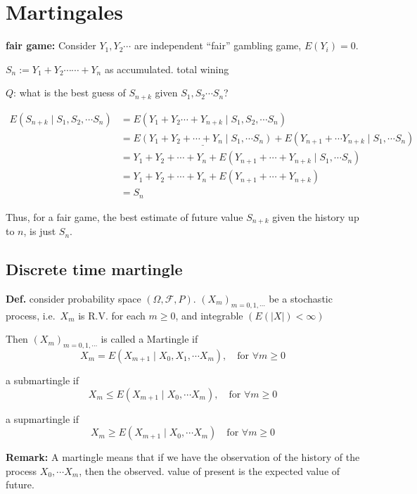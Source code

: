 \documentclass[
  letterpaper,
  DIV=11,
  numbers=noendperiod]{scrreprt}
\theoremstyle{definition}
\theoremstyle{plain}
\theoremstyle{plain}
\theoremstyle{definition}
\theoremstyle{plain}
\theoremstyle{plain}
\theoremstyle{remark}
\begin{document}
\chapter{Martingales}\label{martingales}

\textbf{fair game:} Consider \(Y_1, Y_2 \cdots\) are independent
``fair'' gambling game, \(E(Y_i) = 0\).

\(S_n := Y_1 + Y_2 \cdots \cdots + Y_n\) as accumulated. total wining

\(Q\): what is the best guess of \(S_{n+k}\) given
\(S_1, S_2 \cdots S_n\)?

\[
\begin{aligned}
E(S_{n+k} \mid S_1, S_2, \cdots S_n)
&= E(Y_1 + Y_2 \cdots + Y_{n+k} \mid S_1, S_2, \cdots S_n) \\
&= \underline{E(Y_1 + Y_2 + \cdots + Y_n \mid S_1, \cdots S_n)} + E(Y_{n+1} + \cdots Y_{n+k} \mid S_1, \cdots S_n) \\
&= Y_1 + Y_2 + \cdots + Y_n + E(Y_{n+1} + \cdots + Y_{n+k} \mid S_1, \cdots S_n) \\
&= Y_1 + Y_2 + \cdots + Y_n + E(Y_{n+1} + \cdots + Y_{n+k}) \\
&= S_n
\end{aligned}
\]

Thus, for a fair game, the best estimate of future value \(S_{n+k}\)
given the history up to \(n\), is just \(S_n\).

\section{Discrete time martingle}\label{discrete-time-martingle}

\textbf{Def.} consider probability space \((\Omega, \mathcal{F}, P)\).
\((X_m)_{m=0,1,\cdots}\) be a stochastic process, i.e.~\(X_m\) is R.V.
for each \(m \geq 0\), and integrable \((E(|X|) < \infty)\)

Then \((X_m)_{m=0,1,\cdots}\) is called a Martingle if \[
X_m = E(X_{m+1} \mid X_0, X_1, \cdots X_m), \quad \text{for } \forall m \geq 0
\]

a submartingle if \[
X_m \leq E(X_{m+1} \mid X_0, \cdots X_m), \quad \text{for } \forall m \geq 0
\]

a supmartingle if \[
X_m \geq E(X_{m+1} \mid X_0, \cdots X_m) \quad \text{for } \forall m \geq 0
\]

\textbf{Remark:} A martingle means that if we have the observation of
the history of the process \(X_0, \cdots X_m\), then the observed. value
of present is the expected value of future.
\end{document}

